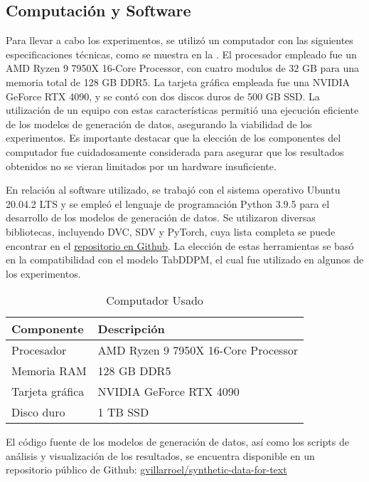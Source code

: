 \subsection{Computación y Software}

Para llevar a cabo los experimentos, se utilizó un computador con las siguientes especificaciones técnicas, como se muestra en la . El procesador empleado fue un AMD Ryzen 9 7950X 16-Core Processor, con cuatro modulos de 32 GB para una memoria total de 128 GB DDR5. La tarjeta gráfica empleada fue una NVIDIA GeForce RTX 4090, y se contó con dos discos duros de 500 GB SSD. La utilización de un equipo con estas características permitió una ejecución eficiente de los modelos de generación de datos, asegurando la viabilidad de los experimentos. Es importante destacar que la elección de los componentes del computador fue cuidadosamente considerada para asegurar que los resultados obtenidos no se vieran limitados por un hardware insuficiente.

En relación al software utilizado, se trabajó con el sistema operativo Ubuntu 20.04.2 LTS y se empleó el lenguaje de programación Python 3.9.5 para el desarrollo de los modelos de generación de datos. Se utilizaron diversas bibliotecas, incluyendo DVC, SDV y PyTorch, cuya lista completa se puede encontrar en el \href{https://github.com/gvillarroel/synthetic-data-for-text/blob/main/freeze.txt}{repositorio en Github}. La elección de estas herramientas se basó en la compatibilidad con el modelo TabDDPM, el cual fue utilizado en algunos de los experimentos.

\begin{table}[H]
	\centering
	\caption{Computador Usado}
	\label{tabla-componentes-pc}
    \begin{tabular}{|l|l|}
        \hline
        \rowcolor[gray]{0.8}
        Componente & Descripción \\
        \hline
        Procesador & AMD Ryzen 9 7950X 16-Core Processor \\
        \hline
        Memoria RAM & 128 GB DDR5 \\
        \hline
        Tarjeta gráfica & NVIDIA GeForce RTX 4090 \\
        \hline
        Disco duro & 1 TB SSD \\
        \hline
      \end{tabular}        
\end{table}  

El código fuente de los modelos de generación de datos, así como los scripts de análisis y visualización de los resultados, se encuentra disponible en un repositorio público de Github:
\href{https://github.com/gvillarroel/synthetic-data-for-text}{gvillarroel/synthetic-data-for-text}


